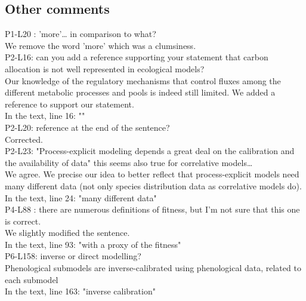 \documentclass[a4paper, 11pt]{article}
\begin{document}
\subsection{Other comments}

P1-L20 : 'more'… in comparison to what?\\
\textcolor{customblue}{We remove the word 'more' which was a clumsiness.}\\

\noindent P2-L16: can you add a reference supporting your statement that carbon allocation is not well represented in ecological models?\\
\textcolor{customblue}{Our knowledge of the regulatory mechanisms that control fluxes among the different metabolic processes and pools is indeed still limited. We added a reference to support our statement.}\\
In the text, line 16: \textcolor{customred}{"\citep{Hartmann2020}"}\\ 

\noindent P2-L20: reference at the end of the sentence?\\
\textcolor{customblue}{Corrected.}\\

\noindent P2-L23: "Process-explicit modeling depends a great deal on the calibration and the availability of data" this seems also true for correlative models…\\
\textcolor{customblue}{We agree. We precise our idea to better reflect that process-explicit models need many different data (not only species distribution data as correlative models do).}\\
In the text, line 24: \textcolor{customred}{"many different data"}\\ 

\noindent P4-L88 : there are numerous definitions of fitness, but I'm not sure that this one is correct.\\
\textcolor{customblue}{We slightly modified the sentence.}\\
In the text, line 93: \textcolor{customred}{"with a proxy of the fitness"}\\ 

\noindent P6-L158: inverse or direct modelling?\\
\textcolor{customblue}{Phenological submodels are inverse-calibrated using phenological data, related to each submodel}\\
In the text, line 163: \textcolor{customred}{"inverse calibration"}\\ 
\end{document}
